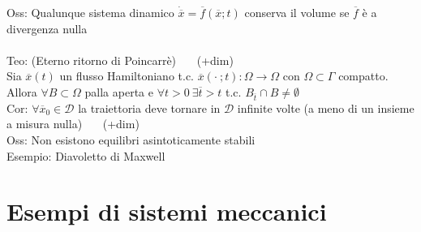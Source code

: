 \documentclass{article}
\theoremstyle{unnumbered}
\theoremstyle{unnumbered1}
\begin{document}
Oss: Qualunque sistema dinamico $\dot{\overline{x}}=\overline{f}(\overline{x};t)$ conserva il volume se $\overline{f}$ è a divergenza nulla \\ \\
%
%
%
Teo: (Eterno ritorno di Poincarrè) \ \ \ (+dim)\\
Sia $\overline{x}(t)$ un flusso Hamiltoniano t.c. $\overline{x}(\cdot\ ;t): \Omega \rightarrow \Omega$ con $\Omega \subset \Gamma$ compatto. \\
Allora $\forall B\subset\Omega$ palla aperta e $\forall t>0 \ \exists\overline{t}>t$ t.c. $B_{\overline{t}}\cap B \neq \emptyset$ \\
%
Cor: $\forall \overline{x}_0\in\mathcal{D}$ la traiettoria deve tornare in $\mathcal{D}$ infinite volte (a meno di un insieme a misura nulla) \ \ \ (+dim)\\
%
Oss: Non esistono equilibri asintoticamente stabili\\ 
%
Esempio: Diavoletto di Maxwell


\section{Esempi di sistemi meccanici}
\end{document}
